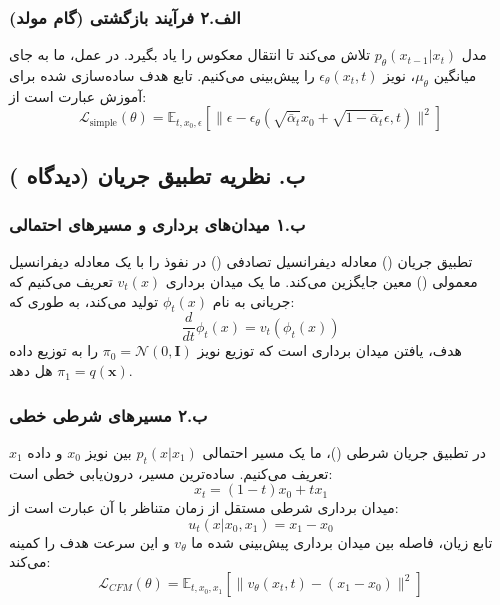 \subsubsection{الف.۲ فرآیند بازگشتی (گام مولد)}
مدل $p_\theta(x_{t-1}|x_t)$ تلاش می‌کند تا انتقال معکوس را یاد بگیرد. در عمل، ما به جای میانگین $\mu_\theta$، نویز $\epsilon_\theta(x_t, t)$ را پیش‌بینی می‌کنیم. تابع هدف ساده‌سازی شده برای آموزش عبارت است از:
\begin{equation}
    \mathcal{L}_{\text{simple}}(\theta) = \mathbb{E}_{t, x_0, \epsilon} [\|\epsilon - \epsilon_\theta(\sqrt{\bar{\alpha}_t} x_0 + \sqrt{1 - \bar{\alpha}_t} \epsilon, t)\|^2]
\end{equation}



\subsection{ب. نظریه تطبیق جریان (دیدگاه )}

\subsubsection{ب.۱ میدان‌های برداری و مسیرهای احتمالی}
تطبیق جریان () معادله دیفرانسیل تصادفی () در نفوذ را با یک معادله دیفرانسیل معمولی () معین جایگزین می‌کند. ما یک میدان برداری $v_t(x)$ تعریف می‌کنیم که جریانی به نام $\phi_t(x)$ تولید می‌کند، به طوری که:
\begin{equation}
    \frac{d}{dt} \phi_t(x) = v_t(\phi_t(x))
\end{equation}
هدف، یافتن میدان برداری است که توزیع نویز $\pi_0 = \mathcal{N}(0, \mathbf{I})$ را به توزیع داده $\pi_1 = q(\mathbf{x})$ هل دهد.

\subsubsection{ب.۲ مسیرهای شرطی خطی}
در تطبیق جریان شرطی ()، ما یک مسیر احتمالی $p_t(x|x_1)$ بین نویز $x_0$ و داده $x_1$ تعریف می‌کنیم. ساده‌ترین مسیر، درون‌یابی خطی است:
\begin{equation}
    x_t = (1-t)x_0 + t x_1
\end{equation}
میدان برداری شرطی مستقل از زمان متناظر با آن عبارت است از:
\begin{equation}
    u_t(x|x_0, x_1) = x_1 - x_0
\end{equation}
تابع زیان، فاصله بین میدان برداری پیش‌بینی شده ما $v_\theta$ و این سرعت هدف را کمینه می‌کند:
\begin{equation}
    \mathcal{L}_{CFM}(\theta) = \mathbb{E}_{t, x_0, x_1} [\|v_\theta(x_t, t) - (x_1 - x_0)\|^2]
\end{equation}



